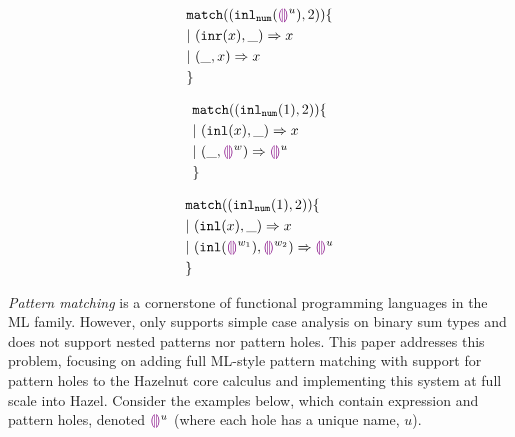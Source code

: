 \documentclass[acmsmall,screen,review,nonacm]{acmart}
\theoremstyle{slplain}
\numberwithin{thm}{section}
\begin{document}
\begin{figure}[h]
\begin{minipage}{0.33\textwidth}
\begin{equation}
\begin{split}
  &\mathtt{match} ((\mathtt{inl}_{\mathtt{num}}({\textcolor{violet}{\llparenthesis}\textcolor{violet}{\rrparenthesis}^{u}}) , 2)) \{\\
  &|~ (\mathtt{inr}(x) , \_) \Rightarrow x \\
  &|~ (\_ , x) \Rightarrow x \\
  &\}
\end{split}
\label{eq:complete}
\end{equation}
\end{minipage}%
\begin{minipage}{0.33\textwidth}
\begin{equation}
\begin{split}
  &\mathtt{match} ((\mathtt{inl}_{\mathtt{num}}({1}) , 2)) \{\\
  &|~ (\mathtt{inl}(x) , \_) \Rightarrow x \\
  &|~ (\_ , \textcolor{violet}{\llparenthesis}\textcolor{violet}{\rrparenthesis}^{w}) \Rightarrow \textcolor{violet}{\llparenthesis}\textcolor{violet}{\rrparenthesis}^{u} \\
  &\}
\end{split}
\label{eq:pathole-exhaustive}
\end{equation}
\end{minipage}%
\begin{minipage}{0.33\textwidth}
\begin{equation}
\begin{split}
  &\mathtt{match} ((\mathtt{inl}_{\mathtt{num}}({1}) , 2)) \{\\
  &|~ (\mathtt{inl}(x) , \_) \Rightarrow x \\
  &|~ (\mathtt{inl}(\textcolor{violet}{\llparenthesis}\textcolor{violet}{\rrparenthesis}^{w_1}) , \textcolor{violet}{\llparenthesis}\textcolor{violet}{\rrparenthesis}^{w_2}) \Rightarrow \textcolor{violet}{\llparenthesis}\textcolor{violet}{\rrparenthesis}^{u} \\
  &\}
\end{split}
\label{eq:pathole-redundant}
\end{equation}
\end{minipage}%
\end{figure}

\emph{Pattern matching} is a cornerstone of functional programming languages in the ML family. 
However, \citet{DBLP:journals/pacmpl/OmarVCH19} only supports simple case analysis on binary sum types and does not support nested patterns nor pattern holes.
This paper addresses this problem, focusing on adding full ML-style pattern matching with support for pattern holes to the Hazelnut core calculus and implementing 
this system at full scale into Hazel. Consider the examples below, which contain expression and pattern holes, denoted $\textcolor{violet}{\llparenthesis}\textcolor{violet}{\rrparenthesis}^{u}$ (where each hole has a unique name, $u$). 
\end{document}
